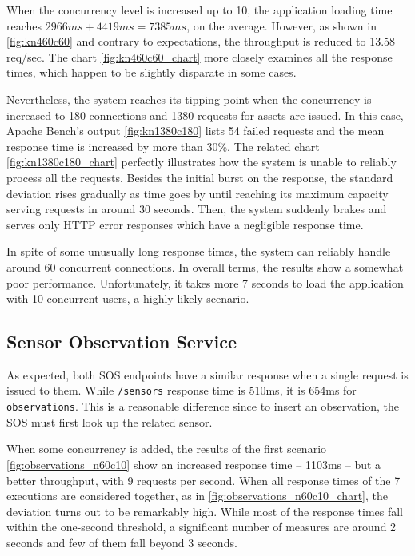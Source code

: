 When the concurrency level is increased up to 10, the application loading time reaches $2966ms + 4419ms = 7385ms$, on the average. However, as shown in \ref{fig:kn460c60} and contrary to expectations, the throughput is reduced to 13.58 req/sec. The chart \ref{fig:kn460c60_chart} more closely examines all the response times, which happen to be slightly disparate in some cases.

Nevertheless, the system reaches its tipping point when the concurrency is increased to 180 connections and 1380 requests for assets are issued. In this case, Apache Bench's output \ref{fig:kn1380c180} lists 54 failed requests and the mean response time is increased by more than 30\%. The related chart \ref{fig:kn1380c180_chart} perfectly illustrates how the system is unable to reliably process all the requests. Besides the initial burst on the response, the standard deviation rises gradually as time goes by until reaching its maximum capacity serving requests in around 30 seconds. Then, the system suddenly brakes and serves only HTTP error responses which have a negligible response time.

In spite of some unusually long response times, the system can reliably handle around 60 concurrent connections. In overall terms, the results show a somewhat poor performance. Unfortunately, it takes more 7 seconds to load the application with 10 concurrent users, a highly likely scenario.

\subsection*{Sensor Observation Service}

As expected, both SOS endpoints have a similar response when a single request is issued to them. While \texttt{/sensors} response time is 510ms, it is 654ms for \texttt{observations}. This is a reasonable difference since to insert an observation, the SOS must first look up the related sensor.

When some concurrency is added, the results of the first scenario \ref{fig:observations_n60c10} show an increased response time -- 1103ms -- but a better throughput, with 9 requests per second. When all response times of the 7 executions are considered together, as in \ref{fig:observations_n60c10_chart}, the deviation turns out to be remarkably high. While most of the response times fall within the one-second threshold, a significant number of measures are around 2 seconds and few of them fall beyond 3 seconds.

